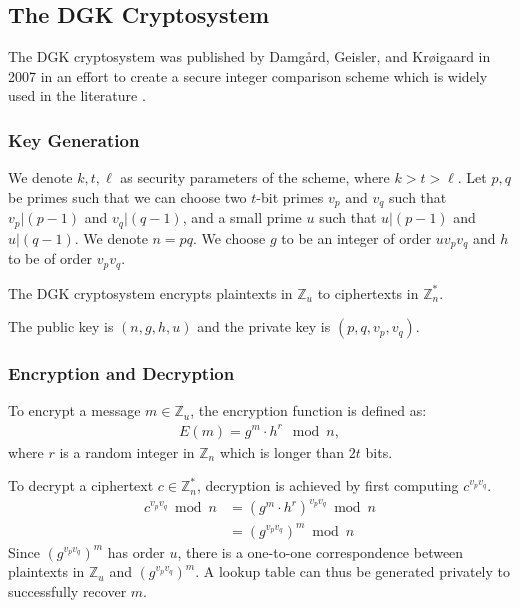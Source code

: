 \subsection{The DGK Cryptosystem}
The DGK cryptosystem was published by Damg{\aa}rd, Geisler, and Kr{\o}igaard in 2007 in an effort to create a secure integer comparison scheme \cite{pieprzyk_efficient_2007, cryptoeprint:2008:321} which is widely used in the literature \cite{veugen_improving_2012}.

\subsubsection{Key Generation}
We denote $k,t,\ell$ as security parameters of the scheme, where $k>t>\ell$.
Let $p,q$ be primes such that
we can choose two $t$-bit primes $v_p$ and $v_q$ such that $v_p | (p-1)$ and $v_q | (q-1)$, and a small prime $u$ such that $u | (p-1)$ and $u | (q-1)$.
We denote $n = pq$.
We choose $g$ to be an integer of order $uv_pv_q$ and $h$ to be of order $v_pv_q$.

The DGK cryptosystem encrypts plaintexts in $\mathbb{Z}_u$ to ciphertexts in $\mathbb{Z}_n^\ast$.

The public key is $(n,g,h,u)$ and the private key is $(p,q,v_p,v_q)$.

\subsubsection{Encryption and Decryption}
To encrypt a message $m \in \mathbb{Z}_u$, the encryption function is defined as:
\begin{align*}
  E(m) = g^m \cdot h^r \mod{n},
\end{align*}
where $r$ is a random integer in $\mathbb{Z}_n$ which is longer than $2t$ bits.

To decrypt a ciphertext $c \in \mathbb{Z}_n^\ast$, decryption is achieved by first computing $c^{v_pv_q}$.
\begin{align*}
	c^{v_pv_q} \bmod n
	&= (g^m \cdot h^r)^{v_pv_q} \bmod n\\
	&= (g^{v_pv_q})^m \bmod n
\end{align*}
Since $(g^{v_pv_q})^m$ has order $u$, there is a one-to-one correspondence between plaintexts in $\mathbb{Z}_u$ and  $(g^{v_pv_q})^m$. A lookup table can thus be generated privately to successfully recover $m$.


